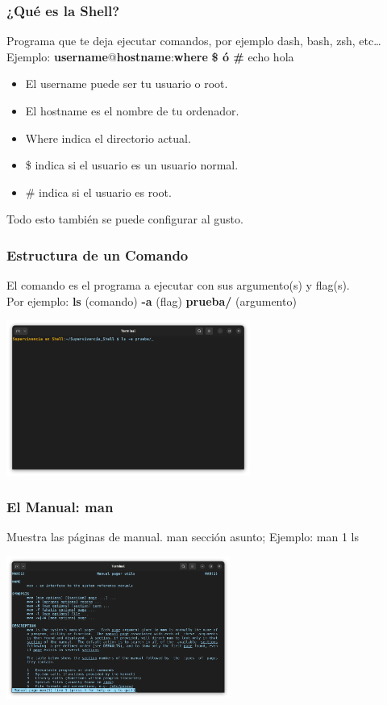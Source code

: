 \documentclass[10pt]{beamer}
\begin{document}
	\begin{frame}
		\frametitle{¿Qué es la Shell?}
		Programa que te deja ejecutar comandos, por ejemplo dash, bash, zsh, etc…	\\
		Ejemplo:
		\textbf{username}@\textbf{hostname}:\textbf{where} \textbf{\$ ó \#} echo hola\\
		\begin{itemize}
			\item El username puede ser tu usuario o root.
			\item El hostname es el nombre de tu ordenador.
			\item Where indica el directorio actual.
			\item \$ indica si el usuario es un usuario normal.
			\item \# indica si el usuario es root.
		\end{itemize}
		Todo esto también se puede configurar al gusto.\\
	\end{frame}

	\begin{frame}
		\frametitle{Estructura de un Comando}
		El comando es el programa a ejecutar con sus argumento(s) y flag(s).\\
		Por ejemplo: \textbf{ls} (comando) \textbf{-a} (flag) \textbf{prueba/} (argumento)		
		\begin{center}
			\includegraphics[width=0.60\textwidth]{cmd}
		\end{center}
	\end{frame}
	
	\begin{frame}
		\frametitle{El Manual: man}
		\begin{alertblock}{Muestra las páginas de manual.}
			man sección asunto;    Ejemplo: man 1 ls
		\end{alertblock}
		\begin{center}
			\includegraphics[width=0.55\textwidth]{man}
		\end{center}
	\end{frame}
	
\end{document}
